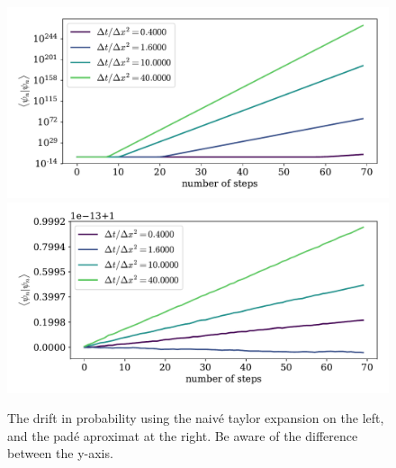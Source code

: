 \documentclass{article}
\begin{document}
    \begin{figure}[!h]
        \centering
        \includegraphics[width=.49\textwidth]{box_w_barrier/step_errorlog.pdf}
        \includegraphics[width=.49\textwidth]{box_w_barrier/step_error.pdf}
        \caption{The drift in probability using the naivé taylor expansion on the left, and the padé aproximat at the right. Be aware of the difference between the y-axis.}
        \label{fig:step_error}
        
    \end{figure}
\end{document}
